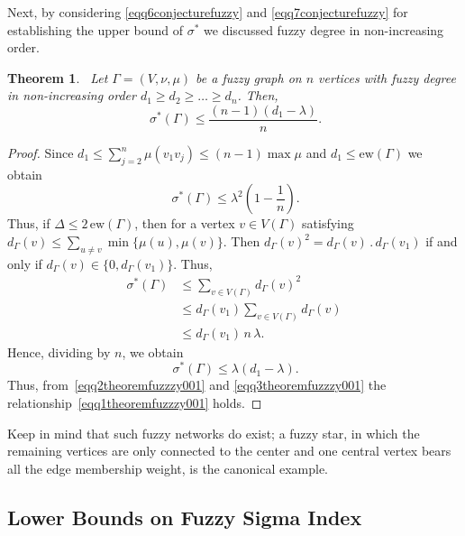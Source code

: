 \documentclass[12pt]{amsart}
\newtheorem{theorem}{Theorem}[section]
\newcommand{\ew}{\mathrm{ew}}
\newcommand{\SF}{\sigma^*}
\begin{document}
Next,  by considering \eqref{eqq6conjecturefuzzy} and \eqref{eqq7conjecturefuzzy} for establishing the upper bound of $\SF$ we discussed fuzzy degree in non-increasing order. 
\begin{theorem}~\label{theoremfuzzzy001}
Let $\Gamma=(V, \nu,\mu)$ be a fuzzy graph on $n$ vertices with fuzzy degree in non-increasing order $d_1\geqslant d_2\geqslant \dots \geqslant d_n$.   Then, 
\begin{equation}~\label{eqq1theoremfuzzzy001}
\SF(\Gamma)\leqslant \frac{(n-1)(d_1-\lambda)}{n}.
\end{equation}
\end{theorem}
\begin{proof}
Since $d_1\leqslant \sum_{j=2}^{n}\mu(v_1v_j)\leqslant (n-1)\max{\mu}$ and $d_1\leqslant \ew(\Gamma)$ we obtain 
\begin{equation}~\label{eqq2theoremfuzzzy001}
\SF(\Gamma)\leqslant \lambda^2\left(1-\frac{1}{n}\right).
\end{equation}
Thus, if $\Delta\leqslant 2\, \ew(\Gamma)$, then for a vertex $v\in V(\Gamma)$ satisfying $d_\Gamma(v)\leqslant \sum_{u\neq v} \min\{\mu(u),\mu(v)  \}.$ Then $d_\Gamma(v)^2=d_\Gamma(v)\,.\,d_\Gamma(v_1)$ if and only if $d_\Gamma(v)\in \{ 0, d_\Gamma(v_1)\}$. Thus, 
\begin{align*}
\SF(\Gamma) &\leqslant \sum_{v\in V(\Gamma)}d_\Gamma(v)^2\\
&\leqslant d_\Gamma(v_1) \sum_{v\in V(\Gamma)}d_\Gamma(v)\\
&\leqslant d_\Gamma(v_1)\,n\,\lambda.
\end{align*}
Hence, dividing by $n$, we obtain 
\begin{equation}~\label{eqq3theoremfuzzzy001}
\SF(\Gamma) \leqslant  \lambda(d_1-\lambda).
\end{equation}
Thus, from~\eqref{eqq2theoremfuzzzy001} and \eqref{eqq3theoremfuzzzy001} the relationship~\eqref{eqq1theoremfuzzzy001} holds.
\end{proof}

Keep in mind that such fuzzy networks do exist; a fuzzy star, in which the remaining vertices are only connected to the center and one central vertex bears all the edge membership weight, is the canonical example.




\subsection{Lower Bounds on Fuzzy Sigma Index}
\end{document}

